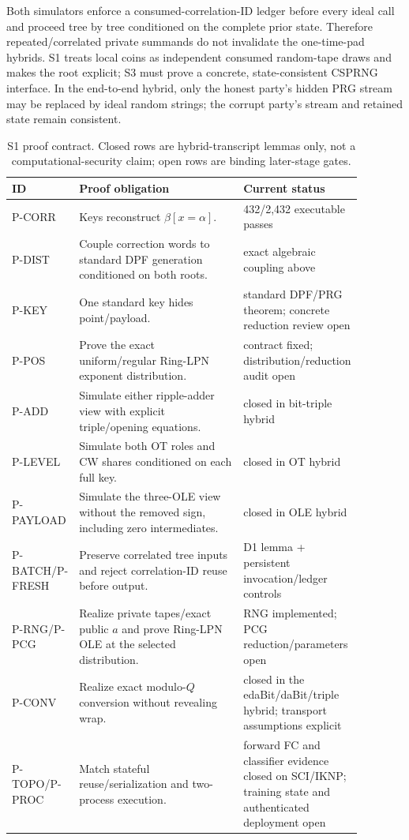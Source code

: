 \documentclass[11pt]{article}
\begin{document}
Both simulators enforce a consumed-correlation-ID ledger before every ideal
call and proceed tree by tree conditioned on the complete prior state.
Therefore repeated/correlated private summands do not invalidate the
one-time-pad hybrids. S1 treats local coins as independent consumed
random-tape draws and makes the root explicit; S3 must prove a concrete,
state-consistent CSPRNG interface. In the end-to-end hybrid, only the honest
party's hidden PRG stream may be replaced by ideal random strings; the corrupt
party's stream and retained state remain consistent.

\begin{table}[ht]
\centering
\scriptsize
\begin{tabular}{>{\raggedright\arraybackslash}p{0.12\linewidth}>{\raggedright\arraybackslash}p{0.58\linewidth}>{\raggedright\arraybackslash}p{0.18\linewidth}}
\toprule
ID & Proof obligation & Current status\\
\midrule
P-CORR & Keys reconstruct $\beta[x=\alpha]$. & 2{,}432/2{,}432 executable passes\\
P-DIST & Couple correction words to standard DPF generation conditioned on
both roots. & exact algebraic coupling above\\
P-KEY & One standard key hides point/payload. & standard DPF/PRG theorem;
concrete reduction review open\\
P-POS & Prove the exact uniform/regular Ring-LPN exponent distribution. &
contract fixed; distribution/reduction audit open\\
P-ADD & Simulate either ripple-adder view with explicit triple/opening
equations. & closed in bit-triple hybrid\\
P-LEVEL & Simulate both OT roles and CW shares conditioned on each full key. &
closed in OT hybrid\\
P-PAYLOAD & Simulate the three-OLE view without the removed sign, including
zero intermediates. & closed in OLE hybrid\\
P-BATCH/P-FRESH & Preserve correlated tree inputs and reject correlation-ID
reuse before output. & D1 lemma + persistent invocation/ledger controls\\
P-RNG/P-PCG & Realize private tapes/exact public $a$ and prove Ring-LPN OLE at
the selected distribution. & RNG implemented; PCG reduction/parameters open\\
P-CONV & Realize exact modulo-$Q$ conversion without revealing wrap. &
closed in the edaBit/daBit/triple hybrid; transport assumptions explicit\\
P-TOPO/P-PROC & Match stateful reuse/serialization and two-process execution. &
forward FC and classifier evidence closed on SCI/IKNP; training state and
authenticated deployment open\\
\bottomrule
\end{tabular}
\caption{S1 proof contract. Closed rows are hybrid-transcript lemmas only,
not a computational-security claim; open rows are binding later-stage gates.}
\label{tab:s1proof}
\end{table}
\end{document}

